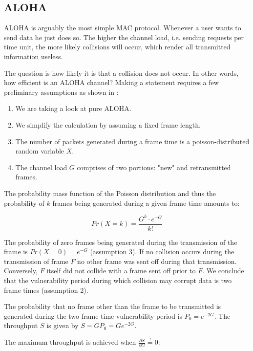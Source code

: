 \subsection{ALOHA}
\label{sec:aloha}

ALOHA is arguably the most simple MAC protocol. Whenever a user wants to send data he just does so. The higher the channel load, i.e. sending requests per time unit, the more likely collisions will occur, which render all transmitted information useless.

The question is how likely it is that a collision does not occur. In other words, how efficient is an ALOHA channel? Making a statement requires a few preliminary assumptions as shown in \cite{Tanenbaum02}:

\smallskip

\begin{enumerate}
	\item We are taking a look at pure ALOHA.
	\item We simplify the calculation by assuming a fixed frame length.
	\item The number of packets generated during a frame time is a poisson-distributed random variable $X$.
	\item The channel load $G$ comprises of two portions: "new" and retransmitted frames.
\end{enumerate}



The probability mass function of the Poisson distribution and thus the probability of $k$ frames being generated during a given frame time amounts to:

\begin{equation}
	Pr(X=k) = \frac{G^k\cdot e^{-G}}{k!}
\end{equation}

The probability of zero frames being generated during the transmission of the frame is $Pr(X=0) = e^{-G}$ (assumption 3). If no collision occurs during the transmission of frame $F$ no other frame was sent off during that transmission. Conversely, $F$ itself did not collide with a frame sent off prior to $F$. We conclude that the vulnerability period during which collision may corrupt data is two frame times (assumption 2).

The probability that no frame other than the frame to be transmitted is generated during the two frame time vulnerability period is $P_0 = e^{-2G}$. The throughput $S$ is given by $S=GP_0 = Ge^{-2G}$.

The maximum throughput is achieved when $\frac{\partial S}{\partial G} \stackrel{!}{=} 0$:

